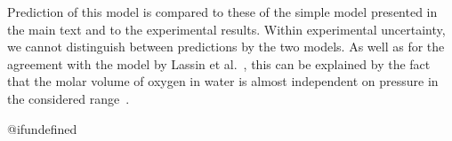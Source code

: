 \documentclass[aps,prl,twocolumn,superscriptaddress,groupedaddress]{revtex4}
\begin{document}
Prediction of this model is compared to these of the simple model presented in the main text and to the experimental results. Within experimental uncertainty, we cannot distinguish between predictions by the two models. As well as for the agreement with the model by Lassin et al.~\cite{helgeson_1981,lassin_2016}, this can be explained by the fact that the molar volume of oxygen in water is almost independent on pressure in the considered range~\cite{mercury_2003}.

\providecommand{\latin}[1]{#1}
\makeatletter
\providecommand{\doi}
  {\begingroup\let\do\@makeother\dospecials
  \catcode`\{=1 \catcode`\}=2 \doi@aux}
\providecommand{\doi@aux}[1]{\endgroup\texttt{#1}}
\makeatother
\providecommand*\mcitethebibliography{\thebibliography}
\csname @ifundefined
  {\let\endmcitethebibliography\endthebibliography}{}
\end{document}
